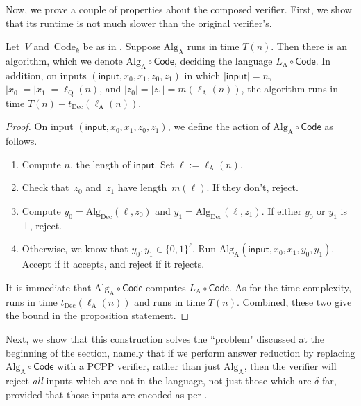 \documentclass[11pt]{article}
\newcommand{\codec}{\mathrm{Code}}
\newcommand{\coded}{\mathrm{Dec}}
\begin{document}
Now, we prove a couple of properties about the composed verifier.
First, we show that its runtime is not much slower than the original verifier's.

\begin{proposition}\label{prop:composed-runtime}
Let~$V$ and~$\codec_k$ be as in .
Suppose $\mathrm{Alg}_{\mathrm{A}}$ runs in time $T(n)$.
Then there is an algorithm, which we denote $\mathrm{Alg}_{\mathrm{A}} \circ \mathsf{Code}$,
deciding the language $L_{\mathrm{A}} \circ \mathsf{Code}$.
In addition, on inputs $(\mathsf{input}, x_0, x_1, z_0, z_1)$
in which $|\mathsf{input}| = n$,
$|x_0| = |x_1| = \ell_{\mathrm{Q}}(n)$,
and $|z_0| = |z_1| = m(\ell_{\mathrm{A}}(n))$,
the algorithm runs
in time $T(n) + t_{\mathrm{Dec}}(\ell_{\mathrm{A}}(n))$.
\end{proposition}

\begin{proof}
On input $(\mathsf{input}, x_0, x_1, z_0, z_1)$, we define the action of $\mathrm{Alg}_{\mathrm{A}} \circ \mathsf{Code}$ as follows.
\begin{enumerate}
\item Compute $n$, the length of $\mathsf{input}$. Set $\ell := \ell_{\mathrm{A}}(n)$.
\item Check that~$z_0$ and~$z_1$ have length~$m(\ell)$. If they don't, reject.
\item Compute $y_0 = \mathrm{Alg}_{\coded}(\ell, z_0)$ and $y_1 = \mathrm{Alg}_{\coded}(\ell, z_1)$. If either $y_0$ or $y_1$ is $\bot$, reject.\label{item:decode-that-string}
\item Otherwise, we know that $y_0, y_1 \in \{0, 1\}^\ell$.  Run $\mathrm{Alg}_{\mathrm{A}}(\mathsf{input}, x_0, x_1, y_0, y_1)$. Accept if it accepts, and reject if it rejects.\label{item:run-that-algorithm}
\end{enumerate}
It is immediate that $\mathrm{Alg}_{\mathrm{A}} \circ \mathsf{Code}$ computes $L_{\mathrm{A}} \circ \mathsf{Code}$.
As for the time complexity,  runs in time $t_{\mathrm{Dec}}(\ell_{\mathrm{A}}(n))$ 
and  runs in time $T(n)$.
Combined, these two give the bound in the proposition statement.
\end{proof}

Next, we show that this construction solves the ``problem" discussed at the beginning of the section,
namely that if we perform answer reduction by replacing $\mathrm{Alg}_{\mathrm{A}} \circ \mathsf{Code}$ with a PCPP verifier,
rather than just $\mathrm{Alg}_{\mathrm{A}}$, then the verifier will reject \emph{all} inputs which are not in the language,
not just those which are $\delta$-far, provided that those inputs are encoded as per .
\end{document}
